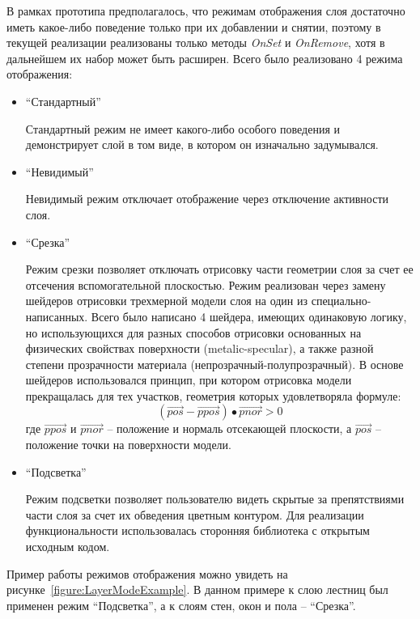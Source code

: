 В рамках прототипа предполагалось, что режимам отображения слоя
достаточно иметь какое-либо поведение только при их добавлении и снятии,
поэтому в текущей реализации реализованы только методы
\emph{OnSet} и \emph{OnRemove}, хотя в дальнейшем
их набор может быть расширен. Всего было реализовано 4 режима отображения:

\begin{itemize}
    \item {
        ``Стандартный''

        Стандартный режим не имеет какого-либо особого поведения и
        демонстрирует слой в том виде, в котором он изначально задумывался.
    }
    \item {
        ``Невидимый''

        Невидимый режим отключает отображение через отключение активности слоя.
    }
    \item {
        ``Срезка''

        Режим срезки позволяет отключать отрисовку части геометрии слоя
        за счет ее отсечения вспомогательной плоскостью.
        Режим реализован через замену шейдеров отрисовки трехмерной
        модели слоя на один из специально-написанных.
        Всего было написано 4 шейдера, имеющих одинаковую логику,
        но использующихся для разных способов отрисовки основанных на физических
        свойствах поверхности (metalic-specular\cite{DocUnity}),
        а также разной степени прозрачности материала (непрозрачный-полупрозрачный).
        В основе шейдеров использовался принцип,
        при котором отрисовка модели прекращалась для тех участков,
        геометрия которых удовлетворяла формуле:
        \[
            ( \vec{pos} - \vec{ppos} ) \bullet
            \vec{pnor} > 0
        \]
        где $\vec{ppos}$ и $\vec{pnor}$ --
        положение и нормаль отсекающей плоскости,
        а $\vec{pos}$ -- положение точки на поверхности модели.%
        \cite{UnityCrossSection}
    }
    \item {
        ``Подсветка''

        Режим подсветки позволяет пользователю видеть скрытые за препятствиями
        части слоя за счет их обведения цветным контуром.
        Для реализации функциональности использовалась сторонняя библиотека
        с открытым исходным кодом.\cite{UnityFxOutline}
    }
\end{itemize}

Пример работы режимов отображения можно увидеть на рисунке~\ref{figure:LayerModeExample}.
В данном примере к слою лестниц был применен режим ``Подсветка'',
а к слоям стен, окон и пола -- ``Срезка''.

